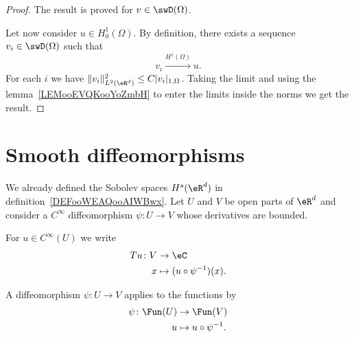 \begin{proof}
        The result is proved for \( v\in\swD(\Omega)\).

        Let now consider \( u\in H_0^1(\Omega)\). By definition, there exists a sequence \( v_i\in\swD(\Omega)\) such that
        \begin{equation}
            v_i\stackrel{H^1(\Omega)}{\longrightarrow}u.
        \end{equation}
        For each \( i\) we have \( \| v_i \|^2_{L^2(\eR^d)}\leq C| v_i |_{1,\Omega}\). Taking the limit and using the lemma~\ref{LEMooEVQKooYoZmbH} to enter the limits inside the norms we get the result.
\end{proof}

\section{Smooth diffeomorphisms}

We already defined the Sobolev spaces \( H^s(\eR^d)\) in definition~\ref{DEFooWEAQooAIWBwx}. Let \( U\) and \( V\) be open parts of \( \eR^d\) and consider a \(  C^{\infty}\) diffeomorphism \( \psi\colon U\to V\) whose derivatives are bounded.

For \( u\in  C^{\infty}(U)\) we write
\begin{equation}        \label{EQooHSVBooIZRxzh}
    \begin{aligned}
        Tu\colon V&\to \eC \\
        x&\mapsto (u\circ \psi^{-1})(x).
    \end{aligned}
\end{equation}

A diffeomorphism \( \psi\colon U\to V\) applies to the functions by
\begin{equation}        \label{EQooMZSEooATfSTR}
    \begin{aligned}
        \psi\colon \Fun(U)&\to \Fun(V) \\
        u&\mapsto u\circ\psi^{-1}.
    \end{aligned}
\end{equation}

